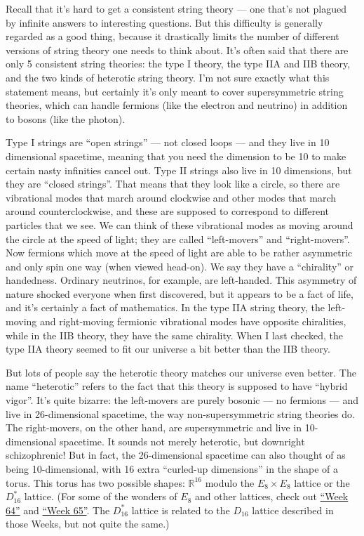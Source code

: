 \documentclass{article}
\begin{document}
Recall that it's hard to get a consistent string theory --- one that's
not plagued by infinite answers to interesting questions. But this
difficulty is generally regarded as a good thing, because it drastically
limits the number of different versions of string theory one needs to
think about. It's often said that there are only 5 consistent string
theories: the type I theory, the type IIA and IIB theory, and the two
kinds of heterotic string theory. I'm not sure exactly what this
statement means, but certainly it's only meant to cover supersymmetric
string theories, which can handle fermions (like the electron and
neutrino) in addition to bosons (like the photon).

Type I strings are ``open strings'' --- not closed loops --- and they
live in 10 dimensional spacetime, meaning that you need the dimension to
be 10 to make certain nasty infinities cancel out. Type II strings also
live in 10 dimensions, but they are ``closed strings''. That means that
they look like a circle, so there are vibrational modes that march
around clockwise and other modes that march around counterclockwise, and
these are supposed to correspond to different particles that we see. We
can think of these vibrational modes as moving around the circle at the
speed of light; they are called ``left-movers'' and ``right-movers''.
Now fermions which move at the speed of light are able to be rather
asymmetric and only spin one way (when viewed head-on). We say they have
a ``chirality'' or handedness. Ordinary neutrinos, for example, are
left-handed. This asymmetry of nature shocked everyone when first
discovered, but it appears to be a fact of life, and it's certainly a
fact of mathematics. In the type IIA string theory, the left-moving and
right-moving fermionic vibrational modes have opposite chiralities,
while in the IIB theory, they have the same chirality. When I last
checked, the type IIA theory seemed to fit our universe a bit better
than the IIB theory.

But lots of people say the heterotic theory matches our universe even
better. The name ``heterotic'' refers to the fact that this theory is
supposed to have ``hybrid vigor''. It's quite bizarre: the left-movers
are purely bosonic --- no fermions --- and live in 26-dimensional
spacetime, the way non-supersymmetric string theories do. The
right-movers, on the other hand, are supersymmetric and live in 10-
dimensional spacetime. It sounds not merely heterotic, but downright
schizophrenic! But in fact, the 26-dimensional spacetime can also
thought of as being 10-dimensional, with 16 extra ``curled-up
dimensions'' in the shape of a torus. This torus has two possible
shapes: \(\mathbb{R}^16\) modulo the \(E_8 \times E_8\) lattice or the
\(D_{16}^*\) lattice. (For some of the wonders of \(E_8\) and other
lattices, check out \protect\hyperlink{week64}{``Week 64''} and
\protect\hyperlink{week65}{``Week 65''}. The \(D_{16}^*\) lattice is
related to the \(D_{16}\) lattice described in those Weeks, but not
quite the same.)
\end{document}
